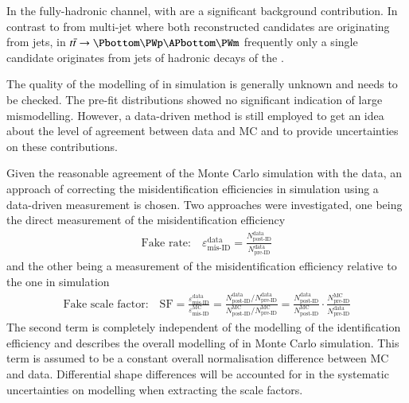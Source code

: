 In the fully-hadronic \hadhad channel, \ttbar with \faketauhad are a
significant background contribution. In contrast to \faketauhad from
multi-jet where both reconstructed \tauhad candidates are originating
from jets, in $\ttbar \ra \Pbottom \PWp \APbottom \PWm$ frequently
only a single \tauhadvis candidate originates from jets of hadronic
decays of the \PW.

The quality of the modelling of \faketauhad in simulation is generally
unknown and needs to be checked. The pre-fit distributions
showed no significant indication of large mismodelling. However, a
data-driven method is still employed to get an idea about the level of
agreement between data and MC and to provide uncertainties on these
contributions.

Given the reasonable agreement of the Monte Carlo simulation with the
data, an approach of correcting the misidentification efficiencies in
simulation using a data-driven measurement is chosen. Two approaches
were investigated, one being the direct measurement of the
misidentification efficiency
\begin{align*}
  \text{Fake rate:}\quad \varepsilon_\text{mis-ID}^\text{data} = \frac{N_\text{post-ID}^\text{data}}{N_\text{pre-ID}^\text{data}}
\end{align*}
and the other being a measurement of the misidentification efficiency
relative to the one in simulation
\begin{align*}
  \text{Fake scale factor:}\quad
  \text{SF} =
  \frac{\varepsilon_\text{mis-ID}^\text{data}}{\varepsilon_\text{mis-ID}^\text{MC}} =
  \frac{N_\text{post-ID}^\text{data} / N_\text{pre-ID}^\text{data}}{N_\text{post-ID}^\text{MC} / N_\text{pre-ID}^\text{MC}}
  = \frac{N_\text{post-ID}^\text{data}}{N_\text{post-ID}^\text{MC}} \cdot \frac{N_\text{pre-ID}^\text{MC}}{N_\text{pre-ID}^\text{data}}
\end{align*}
The second term is completely independent of the modelling of the
\tauhadvis identification efficiency and describes the overall
modelling of \ttbar in Monte Carlo simulation. This term is assumed to
be a constant overall normalisation difference between MC and
data. Differential shape differences will be accounted for in the
systematic uncertainties on \ttbar modelling when extracting the scale
factors.




